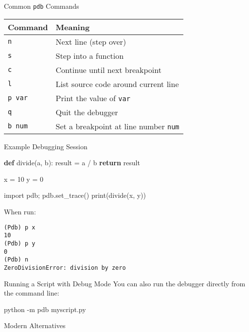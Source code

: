 \documentclass[
  letterpaper,
  DIV=11,
  numbers=noendperiod]{scrreprt}
\newenvironment{Shaded}{\begin{snugshade}}{\end{snugshade}}
\newcommand{\AttributeTok}[1]{\textcolor[rgb]{0.40,0.45,0.13}{#1}}
\newcommand{\BuiltInTok}[1]{\textcolor[rgb]{0.00,0.23,0.31}{#1}}
\newcommand{\ControlFlowTok}[1]{\textcolor[rgb]{0.00,0.23,0.31}{\textbf{#1}}}
\newcommand{\DecValTok}[1]{\textcolor[rgb]{0.68,0.00,0.00}{#1}}
\newcommand{\ExtensionTok}[1]{\textcolor[rgb]{0.00,0.23,0.31}{#1}}
\newcommand{\ImportTok}[1]{\textcolor[rgb]{0.00,0.46,0.62}{#1}}
\newcommand{\KeywordTok}[1]{\textcolor[rgb]{0.00,0.23,0.31}{\textbf{#1}}}
\newcommand{\NormalTok}[1]{\textcolor[rgb]{0.00,0.23,0.31}{#1}}
\newcommand{\OperatorTok}[1]{\textcolor[rgb]{0.37,0.37,0.37}{#1}}
\begin{document}
Common \texttt{pdb} Commands

\begin{longtable}[]{@{}ll@{}}
\toprule\noalign{}
Command & Meaning \\
\midrule\noalign{}
\endhead
\bottomrule\noalign{}
\endlastfoot
\texttt{n} & Next line (step over) \\
\texttt{s} & Step into a function \\
\texttt{c} & Continue until next breakpoint \\
\texttt{l} & List source code around current line \\
\texttt{p\ var} & Print the value of \texttt{var} \\
\texttt{q} & Quit the debugger \\
\texttt{b\ num} & Set a breakpoint at line number \texttt{num} \\
\end{longtable}

Example Debugging Session

\begin{Shaded}
\begin{Highlighting}[]
\KeywordTok{def}\NormalTok{ divide(a, b):}
\NormalTok{    result }\OperatorTok{=}\NormalTok{ a }\OperatorTok{/}\NormalTok{ b}
    \ControlFlowTok{return}\NormalTok{ result}

\NormalTok{x }\OperatorTok{=} \DecValTok{10}
\NormalTok{y }\OperatorTok{=} \DecValTok{0}

\ImportTok{import}\NormalTok{ pdb}\OperatorTok{;}\NormalTok{ pdb.set\_trace()}
\BuiltInTok{print}\NormalTok{(divide(x, y))}
\end{Highlighting}
\end{Shaded}

When run:

\begin{verbatim}
(Pdb) p x
10
(Pdb) p y
0
(Pdb) n
ZeroDivisionError: division by zero
\end{verbatim}

Running a Script with Debug Mode You can also run the debugger directly
from the command line:

\begin{Shaded}
\begin{Highlighting}[]
\ExtensionTok{python} \AttributeTok{{-}m}\NormalTok{ pdb myscript.py}
\end{Highlighting}
\end{Shaded}

Modern Alternatives
\end{document}
